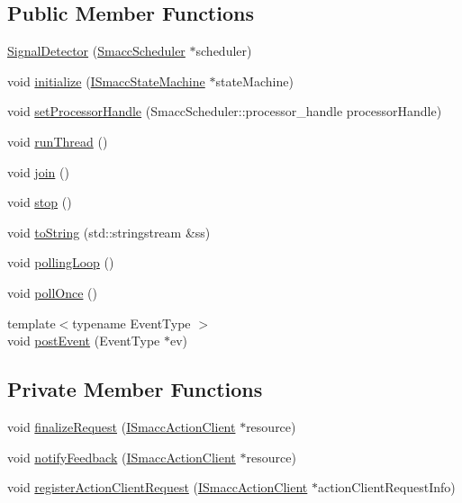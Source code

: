 \subsection*{Public Member Functions}
\begin{DoxyCompactItemize}
\item 
\hyperlink{classsmacc_1_1SignalDetector_aeaefdb0fe56cc527486598417f605c37}{Signal\+Detector} (\hyperlink{common_8h_a13d01c0cecec33c3093445edab0a7eb4}{Smacc\+Scheduler} $\ast$scheduler)
\item 
void \hyperlink{classsmacc_1_1SignalDetector_a91ab3cd92d8095cdaf8610b50731f04b}{initialize} (\hyperlink{classsmacc_1_1ISmaccStateMachine}{I\+Smacc\+State\+Machine} $\ast$state\+Machine)
\item 
void \hyperlink{classsmacc_1_1SignalDetector_aed018c3d7978069dab3f538d077184f0}{set\+Processor\+Handle} (Smacc\+Scheduler\+::processor\+\_\+handle processor\+Handle)
\item 
void \hyperlink{classsmacc_1_1SignalDetector_a48b3fee853ddcb25732408b22ecfcf39}{run\+Thread} ()
\item 
void \hyperlink{classsmacc_1_1SignalDetector_a636f704e469bf74b4a9fdb15bd63d5be}{join} ()
\item 
void \hyperlink{classsmacc_1_1SignalDetector_a536ea005ea4ef4632c0c9c1c62c557a3}{stop} ()
\item 
void \hyperlink{classsmacc_1_1SignalDetector_a1dc830d77ee10717db17015e6ced354c}{to\+String} (std\+::stringstream \&ss)
\item 
void \hyperlink{classsmacc_1_1SignalDetector_a2665e66cdae9f6533c64bbcecf3fa199}{polling\+Loop} ()
\item 
void \hyperlink{classsmacc_1_1SignalDetector_a9a116479e23259f3a5d5d4a47278afd5}{poll\+Once} ()
\item 
{\footnotesize template$<$typename Event\+Type $>$ }\\void \hyperlink{classsmacc_1_1SignalDetector_a6ab99d99cef8d101e39797a72daeb2b7}{post\+Event} (Event\+Type $\ast$ev)
\end{DoxyCompactItemize}
\subsection*{Private Member Functions}
\begin{DoxyCompactItemize}
\item 
void \hyperlink{classsmacc_1_1SignalDetector_af455ae5187fc9405d790992060af647b}{finalize\+Request} (\hyperlink{classsmacc_1_1ISmaccActionClient}{I\+Smacc\+Action\+Client} $\ast$resource)
\item 
void \hyperlink{classsmacc_1_1SignalDetector_a2c848e6d3bc64996cf8f7e56f3de1ee6}{notify\+Feedback} (\hyperlink{classsmacc_1_1ISmaccActionClient}{I\+Smacc\+Action\+Client} $\ast$resource)
\item 
void \hyperlink{classsmacc_1_1SignalDetector_a9a28cc1e9dcf7d204f3589fad8291bfd}{register\+Action\+Client\+Request} (\hyperlink{classsmacc_1_1ISmaccActionClient}{I\+Smacc\+Action\+Client} $\ast$action\+Client\+Request\+Info)
\end{DoxyCompactItemize}
